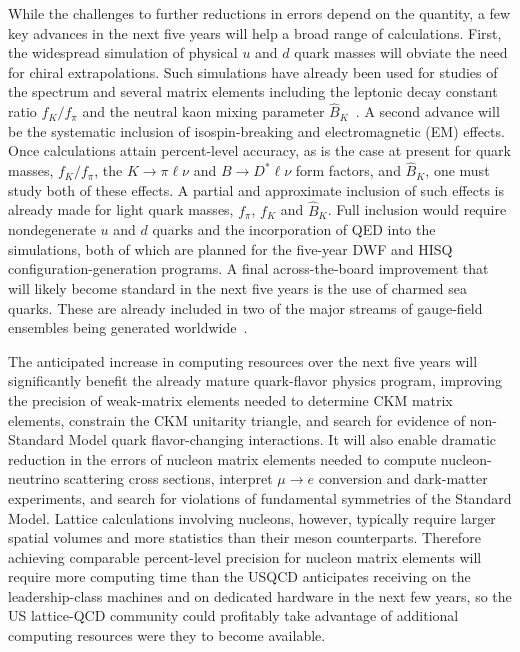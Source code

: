 While the challenges to further reductions in errors depend on the quantity, a
few key advances in the next five years will help a broad range of
calculations.  First, the widespread simulation of physical $u$ and $d$ quark
masses will obviate the need for chiral extrapolations.  Such simulations have
already been used for studies of the spectrum and several matrix elements
including the leptonic decay constant ratio $f_K/f_\pi$ and the neutral kaon
mixing parameter
$\hat{B}_K$~\cite{Aoki:2009ix,Durr:2010vn,Durr:2010aw,Bazavov:2013cp,Dowdall:2013rya}.
A second advance will be the systematic inclusion of isospin-breaking and
electromagnetic (EM) effects.  Once calculations attain percent-level
accuracy, as is the case at present for quark masses, $f_K/f_\pi$, the
$K\to\pi\ell\nu$ and $B\to D^*\ell\nu$ form factors, and $\hat B_K$, one must
study both of these effects.  A partial and approximate inclusion of such
effects is already made for light quark masses, $f_\pi$, $f_K$ and $\hat B_K$.
Full inclusion would require nondegenerate $u$ and $d$ quarks and the
incorporation of QED into the simulations, both of which are planned for the
five-year DWF and HISQ configuration-generation programs.  A final
across-the-board improvement that will likely become standard in the next five
years is the use of charmed sea quarks.  These are already included in two of
the major streams of gauge-field ensembles being generated
worldwide~\cite{Baron:2009wt,Bazavov:2012xda}.

The anticipated increase in computing resources over the next five years will
significantly benefit the already mature quark-flavor physics program,
improving the precision of weak-matrix elements needed to determine CKM matrix
elements, constrain the CKM unitarity triangle, and search for evidence of
non-Standard Model quark flavor-changing interactions.  It will also enable
dramatic reduction in the errors of nucleon matrix elements needed to compute
nucleon-neutrino scattering cross sections, interpret $\mu \to e$ conversion
and dark-matter experiments, and search for violations of fundamental
symmetries of the Standard Model.  Lattice calculations involving nucleons,
however, typically require larger spatial volumes and more statistics than
their meson counterparts.  Therefore achieving comparable percent-level
precision for nucleon matrix elements will require more computing time than
the USQCD anticipates receiving on the leadership-class machines and on
dedicated hardware in the next few years, so the US lattice-QCD community
could profitably take advantage of additional computing resources were they to
become available.


